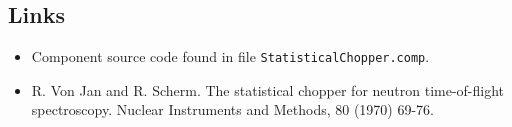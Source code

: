 \subsection*{Links}
\begin{itemize}
  \item Component source code found in file \texttt{StatisticalChopper.comp}.
  \item R. Von Jan and R. Scherm. The statistical chopper for neutron time-of-flight spectroscopy. Nuclear Instruments and Methods, 80 (1970) 69-76.
\end{itemize}
